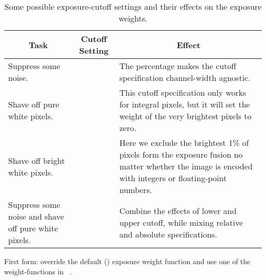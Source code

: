 \begin{codelist}
  \begin{table}
    \begin{maxipage}
      \begin{tabular}{p{.3\linewidth}lp{.3\linewidth}}
        \hline
        \multicolumn{1}{c|}{Task} &
        \multicolumn{1}{c|}{Cutoff Setting} &
        \multicolumn{1}{c}{Effect} \\
        \hline\extraheadingsep
        Suppress some noise. & \option{--exposure-cutoff=5\%} & The percentage makes the cutoff
        specification channel-width agnostic. \\

        Shave off pure white pixels. & \option{--exposure-cutoff=0:-1} & This cutoff
        specification only works for integral pixels, but it will set the weight of the very
        brightest pixels to zero. \\

        Shave off bright white pixels. & \option{--exposure-cutoff=0:-1\%} & Here we exclude the
        brightest 1\% of pixels form the exposure fusion no matter whether the image is encoded
        with integers or floating-point numbers. \\

        Suppress some noise and shave off pure white pixels. & \option{--exposure-cutoff=5\%:-1}
        & Combine the effects of lower and upper cutoff, while mixing relative and absolute
        specifications.
      \end{tabular}
    \end{maxipage}

    \caption[Flexible exposure cutoff]{\label{tab:flexible-exposure-cutoff}%
      Some possible exposure-cutoff settings and their effects on the exposure weights.}
  \end{table}


  \label{opt:exposure-weight-function}%
\item[\itempar{--exposure-weight-function=\metavar{WEIGHT-FUNCTION}~\textrm{(\oldstylefirst~form)}
    \\ --exposure-weight-function=\metavar{SHARED-OBJECT}:\feasiblebreak
    \metavar{SYMBOL}\optional{:\feasiblebreak
      \metavar{ARGUMENT}\optional{:\dots}}~\textrm{(\oldstylesecond~form)}}]\itemend
  First form: override the default () exposure weight
  function and use one of the weight-functions in
  \tableName~.


\end{codelist}

